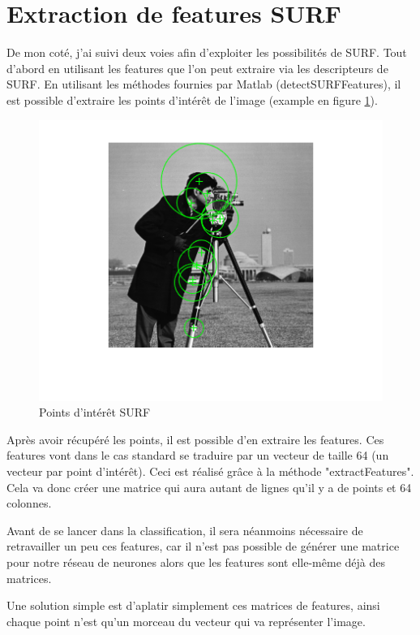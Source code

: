 \section{Extraction de features SURF}

De mon coté, j'ai suivi deux voies afin d'exploiter les possibilités de SURF. Tout d'abord en utilisant les features que l'on peut extraire via les descripteurs de SURF. En utilisant les méthodes fournies par Matlab (detectSURFFeatures), il est possible d'extraire les points d'intérêt de l'image (example en figure \ref{fig:surffeaturesexample}).

\begin{figure}[h]
\centering
\includegraphics{pictures/DetectSURFFeaturesExample_01.png}
\caption{Points d'intérêt SURF}
\label{fig:surffeaturesexample}
\end{figure}

Après avoir récupéré les points, il est possible d'en extraire les features. Ces features vont dans le cas standard se traduire par un vecteur de taille 64 (un vecteur par point d'intérêt). Ceci est réalisé grâce à la méthode "extractFeatures". Cela va donc créer une matrice qui aura autant de lignes qu'il y a de points et 64 colonnes.

Avant de se lancer dans la classification, il sera néanmoins nécessaire de retravailler un peu ces features, car il n'est pas possible de générer une matrice pour notre réseau de neurones alors que les features sont elle-même déjà des matrices.

Une solution simple est d'aplatir simplement ces matrices de features, ainsi chaque point n'est qu'un morceau du vecteur qui va représenter l'image.

